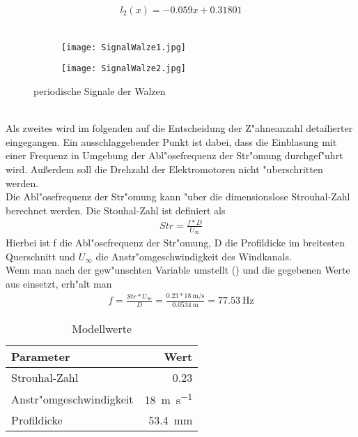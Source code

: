 \begin{align}
{l_2(x)}=-0.059x+0.31801
\label{eq:Spalthoehe2}
\end{align}\\
\begin{figure}[h]
	\centering
	\begin{subfigure}[c]{0.5\textwidth}		
		\texttt{[image: SignalWalze1.jpg]}
	\end{subfigure}
	\begin{subfigure}[c]{0.5\textwidth}
		\texttt{[image: SignalWalze2.jpg]}
	\end{subfigure}
	\caption{periodische Signale der Walzen}
	\label{fig:signal}
\end{figure}\\


Als zweites wird im folgenden auf die Entscheidung der Z"ahneanzahl detailierter eingegangen. Ein ausschlaggebender Punkt ist dabei, dass die Einblasung mit einer Frequenz in Umgebung der Abl"osefrequenz der Str"omung durchgef"uhrt wird. Au\ss{}erdem soll die Drehzahl der Elektromotoren nicht "uberschritten werden.\\
Die Abl"osefrequenz der Str"omung kann "uber die dimensionslose Strouhal-Zahl berechnet werden. Die Stouhal-Zahl ist definiert als \cite{Leder.1992}
\begin{align}
	{Str}=\frac{f*D}{U_{\infty}}	\label{eq:Str}
\end{align}
Hierbei ist f die Abl"osefrequenz der Str"omung, D die Profildicke im breitesten Querschnitt und $U_{\infty}$ die Anstr"omgeschwindigkeit des Windkanals.\\
Wenn man  nach der gew"unschten Variable umstellt () und die gegebenen Werte aus  einsetzt, erh"alt man
\begin{align}
	{f}=\frac{Str*U_{\infty}}{D}
		=\frac{0.23*\SI{18}{\meter\per\second}}{\SI{0.0534}{\meter}}
		=\SI{77.53}{\hertz}
		\label{eq:nachfumgestellt}
\end{align}
\begin{table}[h!]
	\centering
	\begin{tabular}{lr}
		\toprule
		Parameter & Wert\\
		\midrule
		Strouhal-Zahl & 0.23\\
		Anstr"omgeschwindigkeit & \SI{18}{\meter\per\second}\\
		Profildicke & \SI{53.4}{\milli\meter}\\
		\bottomrule
	\end{tabular}
	\caption{Modellwerte}
	\label{tab:Modellwerte}
\end{table}\\
